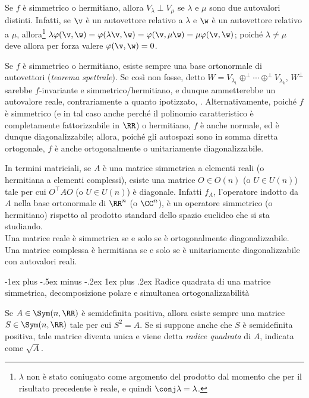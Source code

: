 \documentclass[10pt,landscape]{article}
\makeatletter
\renewcommand{\subsubsection}{\@startsection{subsubsection}{3}{0mm}%
	{-1ex plus -.5ex minus -.2ex}%
	{1ex plus .2ex}%
	{\normalfont\small\bfseries}}
\makeatother
\begin{document}
\begin{multicols}{3}
		Se $f$ è simmetrico o hermitiano, allora $V_\lambda \perp V_\mu$ se $\lambda$ e
		$\mu$ sono due autovalori distinti. Infatti, se $\v$ è un autovettore relativo a $\lambda$ e $\w$ è un autovettore relativo a $\mu$, allora\footnote{$\lambda$ non è stato coniugato come argomento del prodotto dal momento che per il risultato precedente è reale, e quindi $\conj \lambda = \lambda$.} $\lambda \varphi(\v, \w) =
		\varphi(\lambda \v, \w) = \varphi(\v, \mu \w) = \mu \varphi(\v, \w)$; poiché
		$\lambda \neq \mu$ deve allora per forza valere $\varphi(\v, \w) = 0$.
		
		Se $f$ è simmetrico o hermitiano, esiste sempre una
		base ortonormale di autovettori (\textit{teorema spettrale}). Se così non fosse, detto $W = V_{\lambda_1} \oplus^\perp \cdots \oplus^\perp V_{\lambda_k}$, $W^\perp$ sarebbe $f$-invariante e simmetrico/hermitiano, e dunque ammetterebbe un autovalore reale, contrariamente a quanto ipotizzato, \Lightning. Alternativamente, poiché
		$f$ è simmetrico (e in tal caso anche perché il
		polinomio caratteristico è completamente fattorizzabile in $\RR$) o hermitiano, $f$ è anche
		normale, ed è dunque diagonalizzabile; allora, poiché gli autospazi sono in somma diretta ortogonale, $f$ è anche ortogonalmente o unitariamente diagonalizzabile. \\ \vskip 0.05in
		
		In termini matriciali, se $A$ è una matrice
		simmetrica a elementi reali (o hermitiana a elementi complessi), esiste una matrice $O \in O(n)$ (o $U \in U(n)$) tale per cui $O^\top A O$ (o $U \in U(n)$) è diagonale. Infatti $f_A$, l'operatore
		indotto da $A$ nella base ortonormale di $\RR^n$ (o $\CC^n$), è un operatore simmetrico (o hermitiano) rispetto al prodotto standard dello
		spazio euclideo che si sta studiando. \\
		
		Una matrice reale è simmetrica se e solo se è ortogonalmente diagonalizzabile.
		Una matrice complessa è hermitiana se e solo se è unitariamente diagonalizzabile
		con autovalori reali.
		
		\subsubsection{Radice quadrata di una matrice simmetrica, decomposizione polare e simultanea ortogonalizzabilità}
		
		Se $A \in \Sym(n, \RR)$ è semidefinita positiva, allora
		esiste sempre una matrice $S \in \Sym(n, \RR)$ tale
		per cui $S^2 = A$. Se si suppone anche che $S$ è
		semidefinita positiva, tale matrice diventa unica e
		viene detta \textit{radice quadrata} di $A$, indicata come $\sqrt{A}$. \\
		

\end{multicols}
\end{document}
